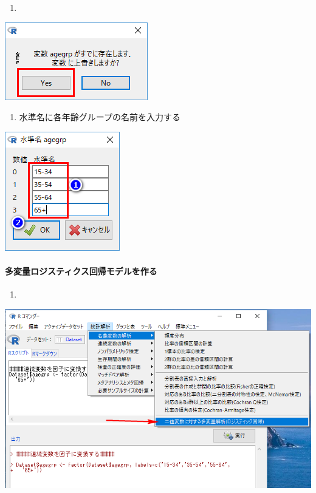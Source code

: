 \documentclass[11pt,]{problemset}
\providecommand{\tightlist}{%
  \setlength{\itemsep}{0pt}\setlength{\parskip}{0pt}}
\let\oldparagraph\paragraph
\renewcommand{\paragraph}[1]{\oldparagraph{#1}\mbox{}}
\begin{document}
\begin{enumerate}
\def\labelenumi{\arabic{enumi}.}
\setcounter{enumi}{2}
\item
\end{enumerate}

\begin{center}\includegraphics[width=0.3\linewidth,height=0.5\textheight]{pic/mltlogstic02} \end{center}

\newpage

\vfill

\begin{enumerate}
\def\labelenumi{\arabic{enumi}.}
\setcounter{enumi}{3}
\tightlist
\item
  水準名に各年齢グループの名前を入力する
\end{enumerate}

\begin{center}\includegraphics[width=0.3\linewidth,height=0.5\textheight]{pic/mltlogstic03} \end{center}

\bigskip\bigskip\bigskip\bigskip\bigskip\bigskip
\bigskip\bigskip

\paragraph{多変量ロジスティクス回帰モデルを作る}

\begin{enumerate}
\def\labelenumi{\arabic{enumi}.}
\item
\end{enumerate}

\begin{center}\includegraphics[width=0.8\linewidth,height=0.5\textheight]{pic/mltlogstic04} \end{center}
\end{document}
